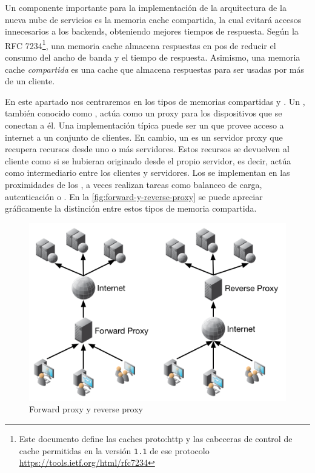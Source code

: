 Un componente importante para la implementación de la arquitectura de la nueva nube de servicios es la memoria cache compartida, la cual evitará accesos innecesarios a los backends, obteniendo mejores tiempos de respuesta.  Según la RFC 7234\footnote{Este documento define las caches \gls{proto:http} y las cabeceras de control de cache permitidas en la versión \texttt{1.1} de ese protocolo\\\url{https://tools.ietf.org/html/rfc7234}}, una memoria cache almacena respuestas en pos de reducir el consumo del ancho de banda y el tiempo de respuesta. Asimismo, una memoria cache \textit{compartida} es una cache que almacena respuestas para ser usadas por más de un cliente.

En este apartado nos centraremos en los tipos de memorias compartidas  y .  Un , también conocido como , actúa como un proxy para los dispositivos que se conectan a él.  Una implementación típica puede ser un  que provee acceso a internet a un conjunto de clientes. En cambio, un  es un servidor proxy que recupera recursos desde uno o más servidores.  Estos recursos se devuelven al cliente como si se hubieran originado desde el propio servidor, es decir, actúa como intermediario entre los clientes y servidores.  Los  se implementan en las proximidades de los , a veces realizan tareas como balanceo de carga, autenticación o . En la \autoref{fig:forward-y-reverse-proxy}  se puede apreciar gráficamente la distinción entre estos tipos de memoria compartida.

\begin{figure}[H]
  \includegraphics[width=\linewidth]{src/images/03-capitulo-3/proxy-forward-reverse.png}
  \caption{Forward proxy y reverse proxy}
  \label{fig:forward-y-reverse-proxy}
\end{figure}
